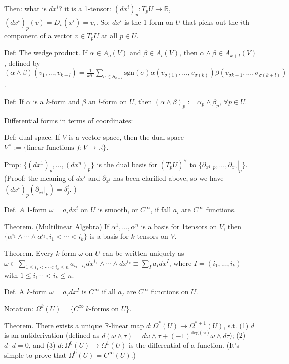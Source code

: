 \documentclass{article}
\theoremstyle{mystyle}
\theoremstyle{remark}
\numberwithin{equation}{section}
\begin{document}
Then: what is $dx^i$? it is a 1-tensor: $(dx^i)_p\colon T_pU\rightarrow \mathbb{R}$, $(dx^i)_p(v) = D_v(x^i)= v_i$. So: $d x^i$ is the 1-form on $U$ that picks out the $i$th component of a vector $v \in T_pU$ at all $p \in U$. 

Def: The wedge product. If $\alpha \in A_o(V)$ and $\beta \in A_l(V)$, then $\alpha \wedge \beta \in A_{k+l}(V)$, defined by $(\alpha \wedge \beta)(v_1,...,v_{k+l}) = \frac{1}{k!l!}\sum_{\sigma \in S_{k+l}}
\mathrm{sgn}(\sigma) \alpha(v_{\sigma(1)},...,v_{\sigma(k)})
\beta(v_{\sigma{k+1}},...,\sigma_{\sigma(k+l)})$. 

Def: If $\alpha$ is a $k$-form and $\beta$ an $l$-form on $U$, then $(\alpha\wedge \beta)_p := \alpha_p\wedge \beta_p$, $\forall p\in U$.

Differential forms in terms of coordinates:

Def: dual space. If $V$ is a vector space, then the dual space $V^\vee:=\{\text{linear functions }f\colon V\rightarrow \mathbb{R}\}$.

Prop: $\{(d x^1)_p,...,(d x^n)_p\}$ is the dual basis for $(T_pU)^\vee$ to $\{\partial_{x^1}|_p,...,\partial_{x^n}|_p\}$. (Proof: the meaning of $d x^i$ and $\partial_{x^i}$ has been clarified above, so we have $(dx^i)_p(\partial_{x^j}|_p) = \delta^i_j$. )

Def. $A$ 1-form $\omega = a_i d x^i$ on $U$ is smooth, or $C^\infty$, if fall $a_i$ are $C^\infty$ functions.

Theorem. (Multilinear Algebra) If $\alpha^1,...,\alpha^n$ is a basis for 1tensors on $V$, then $\{\alpha^{i_1}\wedge \cdots \wedge \alpha^{i_k},i_1<\cdots <i_k\}$ is a basis for $k$-tensors on $V$.

Theorem. Every $k$-form $\omega$ on $U$ can be written uniquely as $\omega \in \sum_{1\leq i_1<\cdots <i_k\leq n} a_{i_1...i_k} d x^{i_1}\wedge \cdots \wedge d x^{i_k} \equiv \sum_I a_I d x^I$, where $I = (i_1,...,i_k)$ with $1\leq i_1\cdots <i_k\leq n$. 

Def. A $k$-form $\omega = a_I d x^I$ is $C^\infty$ if all $a_I$ are $C^\infty$ functions on $U$. 

Notation: $\Omega^k(U) = \{C^\infty~ k\text{-forms on }U\}$. 

Theorem. There exists a unique $\mathbb{R}$-linear map $d\colon \Omega^*(U)\rightarrow \Omega^{*+1}(U)$, s.t. (1) $d$ is an antiderivation (defined as $d(\omega \wedge \tau) = d\omega \wedge \tau + (-1)^{\mathrm{deg}(\omega)} \omega \wedge d\tau$); (2) $d\cdot d = 0$, and (3) $d\colon \Omega^0(U)\rightarrow \Omega^1(U)$ is the differential of a function. (It's simple to prove that $\Omega^0(U) = C^\infty (U)$.)
\end{document}
